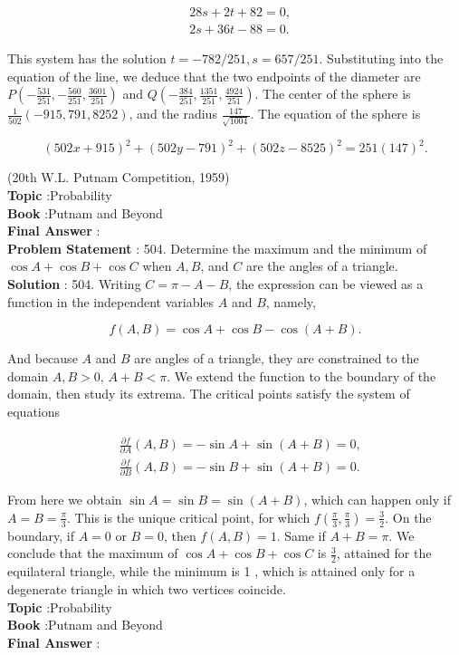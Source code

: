 \documentclass[10pt]{article}
\begin{document}
$$
\begin{aligned}
&28 s+2 t+82=0, \\
&2 s+36 t-88=0 .
\end{aligned}
$$

This system has the solution $t=-782 / 251, s=657 / 251$. Substituting into the equation of the line, we deduce that the two endpoints of the diameter are $P\left(-\frac{531}{251},-\frac{560}{251}, \frac{3601}{251}\right)$ and $Q\left(-\frac{384}{251}, \frac{1351}{251}, \frac{4924}{251}\right)$. The center of the sphere is $\frac{1}{502}(-915,791,8252)$, and the radius $\frac{147}{\sqrt{1004}}$. The equation of the sphere is

$$
(502 x+915)^{2}+(502 y-791)^{2}+(502 z-8525)^{2}=251(147)^{2} .
$$

(20th W.L. Putnam Competition, 1959)
\\
\textbf{Topic} :Probability\\
\textbf{Book} :Putnam and Beyond\\
\textbf{Final Answer} :\\


\textbf{Problem Statement} :
504. Determine the maximum and the minimum of $\cos A+\cos B+\cos C$ when $A, B$, and $C$ are the angles of a triangle.
\\
\textbf{Solution} :
504. Writing $C=\pi-A-B$, the expression can be viewed as a function in the independent variables $A$ and $B$, namely,

$$
f(A, B)=\cos A+\cos B-\cos (A+B) .
$$

And because $A$ and $B$ are angles of a triangle, they are constrained to the domain $A, B>0$, $A+B<\pi$. We extend the function to the boundary of the domain, then study its extrema. The critical points satisfy the system of equations 

$$
\begin{aligned}
&\frac{\partial f}{\partial A}(A, B)=-\sin A+\sin (A+B)=0, \\
&\frac{\partial f}{\partial B}(A, B)=-\sin B+\sin (A+B)=0 .
\end{aligned}
$$

From here we obtain $\sin A=\sin B=\sin (A+B)$, which can happen only if $A=B=\frac{\pi}{3}$. This is the unique critical point, for which $f\left(\frac{\pi}{3}, \frac{\pi}{3}\right)=\frac{3}{2}$. On the boundary, if $A=0$ or $B=0$, then $f(A, B)=1$. Same if $A+B=\pi$. We conclude that the maximum of $\cos A+\cos B+\cos C$ is $\frac{3}{2}$, attained for the equilateral triangle, while the minimum is 1 , which is attained only for a degenerate triangle in which two vertices coincide.
\\
\textbf{Topic} :Probability\\
\textbf{Book} :Putnam and Beyond\\
\textbf{Final Answer} :\\
\end{document}
